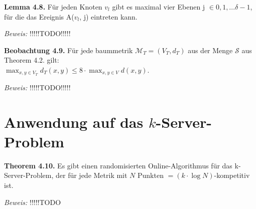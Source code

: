 \textbf{Lemma 4.8.} Für jeden Knoten $v_{l}$ gibt es maximal vier Ebenen j $\in {0, 1, ... \delta - 1}$, für die das Ereignis A($v_{l}$, j) eintreten kann.

\textit{Beweis:} !!!!!TODO!!!!!

\textbf{Beobachtung 4.9.} Für jede baummetrik $\mathcal{M}_{T} = (V_{T}, d_{T})$ aus der Menge $\mathcal{S}$ aus Theorem 4.2. gilt: \\
$\max_{x, y \in V_{T}} d_{T}(x, y) \le 8 \cdot \max_{x, y \in V} d(x, y)$.

\textit{Beweis:} !!!!!TODO!!!!!

\section{Anwendung auf das $k$-Server-Problem}


\textbf{Theorem 4.10.} Es gibt einen randomisierten Online-Algorithmus für das k-Server-Problem, der für jede Metrik mit $N$ Punkten $=(k \cdot \log N)$-kompetitiv ist.

\textit{Beweis:} !!!!!TODO
